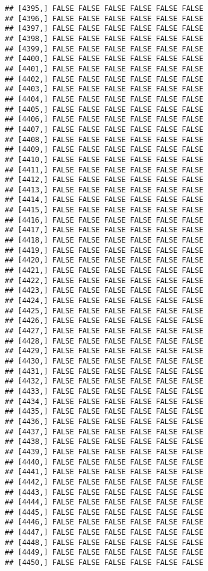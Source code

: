 \documentclass[
]{article}
\begin{document}
\begin{verbatim}
## [4395,] FALSE FALSE FALSE FALSE FALSE FALSE
## [4396,] FALSE FALSE FALSE FALSE FALSE FALSE
## [4397,] FALSE FALSE FALSE FALSE FALSE FALSE
## [4398,] FALSE FALSE FALSE FALSE FALSE FALSE
## [4399,] FALSE FALSE FALSE FALSE FALSE FALSE
## [4400,] FALSE FALSE FALSE FALSE FALSE FALSE
## [4401,] FALSE FALSE FALSE FALSE FALSE FALSE
## [4402,] FALSE FALSE FALSE FALSE FALSE FALSE
## [4403,] FALSE FALSE FALSE FALSE FALSE FALSE
## [4404,] FALSE FALSE FALSE FALSE FALSE FALSE
## [4405,] FALSE FALSE FALSE FALSE FALSE FALSE
## [4406,] FALSE FALSE FALSE FALSE FALSE FALSE
## [4407,] FALSE FALSE FALSE FALSE FALSE FALSE
## [4408,] FALSE FALSE FALSE FALSE FALSE FALSE
## [4409,] FALSE FALSE FALSE FALSE FALSE FALSE
## [4410,] FALSE FALSE FALSE FALSE FALSE FALSE
## [4411,] FALSE FALSE FALSE FALSE FALSE FALSE
## [4412,] FALSE FALSE FALSE FALSE FALSE FALSE
## [4413,] FALSE FALSE FALSE FALSE FALSE FALSE
## [4414,] FALSE FALSE FALSE FALSE FALSE FALSE
## [4415,] FALSE FALSE FALSE FALSE FALSE FALSE
## [4416,] FALSE FALSE FALSE FALSE FALSE FALSE
## [4417,] FALSE FALSE FALSE FALSE FALSE FALSE
## [4418,] FALSE FALSE FALSE FALSE FALSE FALSE
## [4419,] FALSE FALSE FALSE FALSE FALSE FALSE
## [4420,] FALSE FALSE FALSE FALSE FALSE FALSE
## [4421,] FALSE FALSE FALSE FALSE FALSE FALSE
## [4422,] FALSE FALSE FALSE FALSE FALSE FALSE
## [4423,] FALSE FALSE FALSE FALSE FALSE FALSE
## [4424,] FALSE FALSE FALSE FALSE FALSE FALSE
## [4425,] FALSE FALSE FALSE FALSE FALSE FALSE
## [4426,] FALSE FALSE FALSE FALSE FALSE FALSE
## [4427,] FALSE FALSE FALSE FALSE FALSE FALSE
## [4428,] FALSE FALSE FALSE FALSE FALSE FALSE
## [4429,] FALSE FALSE FALSE FALSE FALSE FALSE
## [4430,] FALSE FALSE FALSE FALSE FALSE FALSE
## [4431,] FALSE FALSE FALSE FALSE FALSE FALSE
## [4432,] FALSE FALSE FALSE FALSE FALSE FALSE
## [4433,] FALSE FALSE FALSE FALSE FALSE FALSE
## [4434,] FALSE FALSE FALSE FALSE FALSE FALSE
## [4435,] FALSE FALSE FALSE FALSE FALSE FALSE
## [4436,] FALSE FALSE FALSE FALSE FALSE FALSE
## [4437,] FALSE FALSE FALSE FALSE FALSE FALSE
## [4438,] FALSE FALSE FALSE FALSE FALSE FALSE
## [4439,] FALSE FALSE FALSE FALSE FALSE FALSE
## [4440,] FALSE FALSE FALSE FALSE FALSE FALSE
## [4441,] FALSE FALSE FALSE FALSE FALSE FALSE
## [4442,] FALSE FALSE FALSE FALSE FALSE FALSE
## [4443,] FALSE FALSE FALSE FALSE FALSE FALSE
## [4444,] FALSE FALSE FALSE FALSE FALSE FALSE
## [4445,] FALSE FALSE FALSE FALSE FALSE FALSE
## [4446,] FALSE FALSE FALSE FALSE FALSE FALSE
## [4447,] FALSE FALSE FALSE FALSE FALSE FALSE
## [4448,] FALSE FALSE FALSE FALSE FALSE FALSE
## [4449,] FALSE FALSE FALSE FALSE FALSE FALSE
## [4450,] FALSE FALSE FALSE FALSE FALSE FALSE

\end{verbatim}
\end{document}

